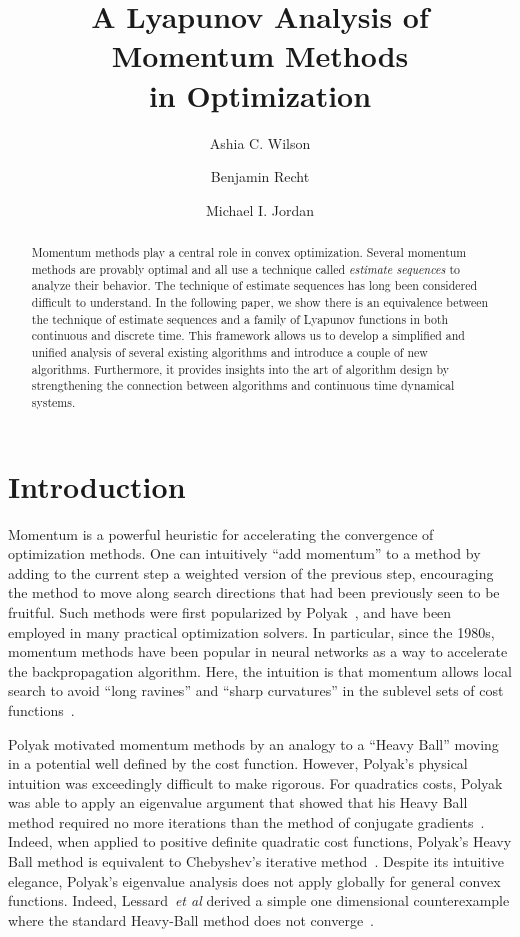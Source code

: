 \documentclass[11pt]{article}
\theoremstyle{plain}
\begin{document}
\title{A Lyapunov Analysis of Momentum Methods \\ in  Optimization}
\date{}
\author{Ashia C. Wilson \and Benjamin Recht \and Michael I. Jordan}
\maketitle
\begin{abstract}
Momentum methods play a central role in convex optimization. Several momentum methods are provably optimal and all use a technique called {\em estimate sequences} to analyze their behavior.  The technique of estimate sequences has long been considered difficult to understand. In the following paper, we show there is an equivalence between the technique of estimate sequences and a family of Lyapunov functions in both continuous and discrete time. This framework allows us to develop a simplified and unified analysis of several existing algorithms and introduce a couple of new algorithms. Furthermore, it provides insights into the art of algorithm design by strengthening the connection between algorithms and continuous time dynamical systems. 
\end{abstract}

\section{Introduction}

Momentum is a powerful heuristic for accelerating the convergence of optimization methods.    One can intuitively ``add momentum'' to a method by adding to the current step a weighted version of the previous step, encouraging the method to move along search directions that had been previously seen to be fruitful.  Such methods were first popularized by Polyak~\cite{Polyak1964}, and have been employed in many practical optimization solvers.  In particular, since the 1980s, momentum methods have been popular in neural networks as a way to accelerate the backpropagation algorithm.  Here, the intuition is that momentum allows local search to avoid ``long ravines'' and ``sharp curvatures'' in the sublevel sets of cost functions~\cite{Rumelhardt}.

Polyak motivated momentum methods by an analogy to a ``Heavy Ball'' moving in a potential well defined by the cost function.  However, Polyak's physical intuition was exceedingly difficult to make rigorous.  For quadratics costs, Polyak was able to apply an eigenvalue argument that showed that his Heavy Ball method required no more iterations than the method of conjugate gradients~\cite{Polyak1964}.  
Indeed, when applied to positive definite quadratic cost functions, Polyak's Heavy Ball method is equivalent to Chebyshev's iterative method~\cite{Chebyshev}.   Despite its intuitive elegance, Polyak's eigenvalue analysis does not apply globally for general convex functions. Indeed, Lessard~\emph{et al} derived a simple one dimensional counterexample where the standard Heavy-Ball method does not converge~\cite{Lessard14}.  
\end{document}
